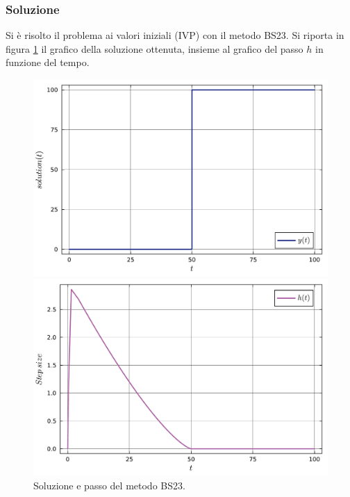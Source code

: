 \documentclass[letterpaper, 12pt]{article}
\numberwithin{equation}{section}    %
\begin{document}
\subsubsection{Soluzione}
Si è risolto il problema ai valori iniziali (IVP) con il metodo BS23. Si riporta in figura \ref{fig:es6_3_7} 
il grafico della soluzione ottenuta, insieme al grafico del passo $h$ in funzione del tempo. \\
\begin{figure}[!ht]
    \centering
    \begin{minipage}[b]{0.47\textwidth}
        \includegraphics[width=\textwidth]{6371.pdf}
    \end{minipage}
    \hspace{0.5cm}
    \begin{minipage}[b]{0.47\textwidth}
        \includegraphics[width=\textwidth]{6372.pdf}
    \end{minipage}
    \caption{Soluzione e passo del metodo BS23.}
    \label{fig:es6_3_7}
\end{figure}
\end{document}
